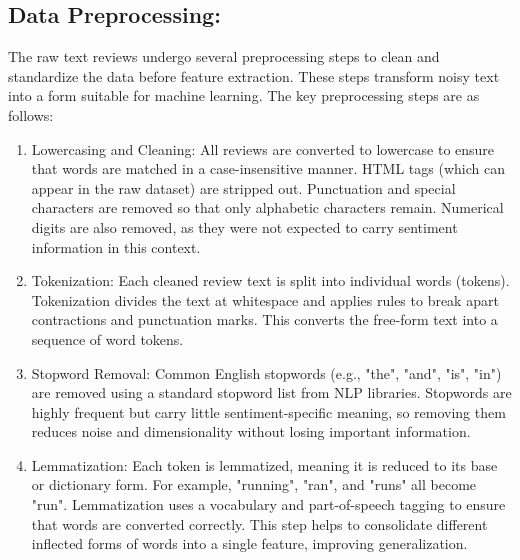 \documentclass{article}
\begin{document}
\subsection{Data Preprocessing:}
The raw text reviews undergo several preprocessing steps to clean and standardize the data before feature extraction. These steps transform noisy text into a form suitable for machine learning. The key preprocessing steps are as follows:
\begin{enumerate}
\item Lowercasing and Cleaning: All reviews are converted to lowercase to ensure that words are matched in a case-insensitive manner. HTML tags (which can appear in the raw dataset) are stripped out. Punctuation and special characters are removed so that only alphabetic characters remain. Numerical digits are also removed, as they were not expected to carry sentiment information in this context.
\item Tokenization: Each cleaned review text is split into individual words (tokens). Tokenization divides the text at whitespace and applies rules to break apart contractions and punctuation marks. This converts the free-form text into a sequence of word tokens.
\item Stopword Removal: Common English stopwords (e.g., "the", "and", "is", "in") are removed using a standard stopword list from NLP libraries. Stopwords are highly frequent but carry little sentiment-specific meaning, so removing them reduces noise and dimensionality without losing important information.
\item Lemmatization: Each token is lemmatized, meaning it is reduced to its base or dictionary form. For example, "running", "ran", and "runs" all become "run". Lemmatization uses a vocabulary and part-of-speech tagging to ensure that words are converted correctly. This step helps to consolidate different inflected forms of words into a single feature, improving generalization.
\end{enumerate}
\end{document}
